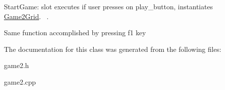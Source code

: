 Start\+Game\+: slot executes if user presses on play\+\_\+button, instantiates \hyperlink{classGame2Grid}{Game2\+Grid}.~\newline
. 

Same function accomplished by pressing f1 key 

The documentation for this class was generated from the following files\+:\begin{DoxyCompactItemize}
\item 
game2.\+h\item 
game2.\+cpp\end{DoxyCompactItemize}
